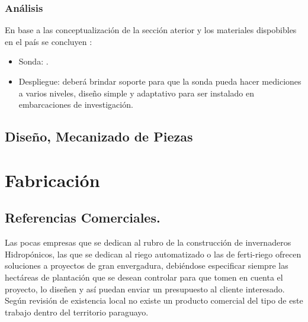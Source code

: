 \subsubsection{An\'alisis}
En base a las conceptualizaci\'on de la secci\'on aterior y los materiales dispobibles en el pa\'is se concluyen  :
\begin{itemize}
    \item Sonda: .
    \item Despliegue: deber\'a brindar soporte para que la sonda pueda hacer mediciones a varios niveles, dise\~no simple y adaptativo para ser instalado en embarcaciones de investigaci\'on.
\end{itemize}

\subsection{Diseño, Mecanizado de Piezas}



\section{Fabricaci\'on}









         

\subsection{Referencias Comerciales.}
Las pocas empresas que se dedican al rubro de la construcción de invernaderos Hidropónicos, las que se dedican al riego automatizado o las de ferti-riego ofrecen soluciones a proyectos de gran envergadura, debiéndose especificar siempre las hectáreas de plantación que se desean controlar para que tomen en cuenta el proyecto, lo diseñen y así puedan enviar un presupuesto al cliente interesado.
Según revisión de existencia local no existe un producto comercial del tipo de este trabajo dentro del territorio paraguayo.\textbf{}






